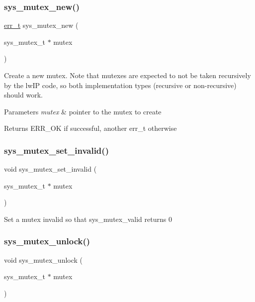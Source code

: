 \subsubsection{\texorpdfstring{sys\+\_\+mutex\+\_\+new()}{sys\_mutex\_new()}}
{\footnotesize\ttfamily \hyperlink{group__infrastructure__errors_gaf02d9da80fd66b4f986d2c53d7231ddb}{err\+\_\+t} sys\+\_\+mutex\+\_\+new (\begin{DoxyParamCaption}\item[{sys\+\_\+mutex\+\_\+t $\ast$}]{mutex }\end{DoxyParamCaption})}

Create a new mutex. Note that mutexes are expected to not be taken recursively by the lw\+IP code, so both implementation types (recursive or non-\/recursive) should work. 
\begin{DoxyParams}{Parameters}
{\em mutex} & pointer to the mutex to create \\
\hline
\end{DoxyParams}
\begin{DoxyReturn}{Returns}
E\+R\+R\+\_\+\+OK if successful, another err\+\_\+t otherwise 
\end{DoxyReturn}
\mbox{\label{group__sys__mutex_ga3f392725971dc837aa56dd7e45fa7ca8}} 
\subsubsection{\texorpdfstring{sys\+\_\+mutex\+\_\+set\+\_\+invalid()}{sys\_mutex\_set\_invalid()}}
{\footnotesize\ttfamily void sys\+\_\+mutex\+\_\+set\+\_\+invalid (\begin{DoxyParamCaption}\item[{sys\+\_\+mutex\+\_\+t $\ast$}]{mutex }\end{DoxyParamCaption})}

Set a mutex invalid so that sys\+\_\+mutex\+\_\+valid returns 0 \mbox{\label{group__sys__mutex_ga5568f68898fe9d5735f9ce2f665624fb}} 
\subsubsection{\texorpdfstring{sys\+\_\+mutex\+\_\+unlock()}{sys\_mutex\_unlock()}}
{\footnotesize\ttfamily void sys\+\_\+mutex\+\_\+unlock (\begin{DoxyParamCaption}\item[{sys\+\_\+mutex\+\_\+t $\ast$}]{mutex }\end{DoxyParamCaption})}

